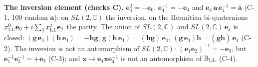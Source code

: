 \documentclass[
  10pt,
]{article}
\begin{document}
\textbf{The inversion element (checks C).}
\(\mathbf e_4^2=-\mathbf e_0\), \(\mathbf e_4^{-1}=-\mathbf e_4\) and
\(\mathbf e_4\,\mathbf a\,\mathbf e_4^{-1}=\bar{\mathbf a}\) (C-1, 100
random \(\mathbf a\)): on \(SL(2,\mathbb C)\) the inversion, on the
Hermitian bi-quaternions
\(x^0_{\rm LL}\mathbf e_0+i\sum_jx^j_{\rm LL}\mathbf e_j\) the parity.
The union of \(SL(2,\mathbb C)\) and \(SL(2,\mathbb C)\,\mathbf e_4\) is
closed:
\((\mathbf g\,\mathbf e_4)(\mathbf h\,\mathbf e_4)=-\bar{\mathbf h}\mathbf g\),
\(\mathbf g(\mathbf h\,\mathbf e_4)=(\mathbf h\mathbf g)\,\mathbf e_4\),
\((\mathbf g\,\mathbf e_4)\mathbf h=(\mathbf g\bar{\mathbf h})\,\mathbf e_4\)
(C-2). The inversion is not an automorphism of \(SL(2,\mathbb C)\):
\((\mathbf e_1\mathbf e_2)^{-1}=-\mathbf e_3\), but
\(\mathbf e_1^{-1}\mathbf e_2^{-1}=+\mathbf e_3\) (C-3); and
\(\mathbf x\mapsto\mathbf e_4\mathbf x\mathbf e_4^{-1}\) is not an
automorphism of \(\mathbb B_{\rm LL}\) (C-4).
\end{document}
